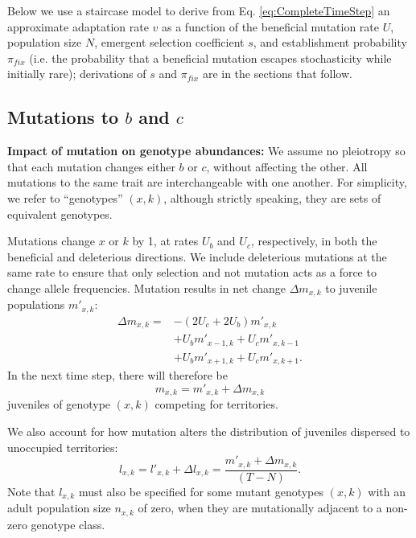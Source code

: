 \documentclass[9pt,twocolumn,twoside,lineno]{gsajnl}
\begin{document}
Below we use a staircase model \citep{desai2007beneficial} to derive from Eq. \ref{eq:CompleteTimeStep} an approximate adaptation rate $v$ as a function of the beneficial mutation rate $U$, population size $N$, emergent selection coefficient $s$, and establishment probability $\pi_{fix}$ (i.e. the probability that a beneficial mutation escapes stochasticity while initially rare); derivations of $s$ and $\pi_{fix}$ are in the sections that follow.

\subsection{Mutations to $b$ and $c$}
\label{sec:MutationSelection}
\textbf{Impact of mutation on genotype abundances:}
We assume no pleiotropy so that each mutation changes either $b$ or $c$, without affecting the other. All mutations to the same trait are interchangeable with one another. For simplicity, we refer to ``genotypes'' $(x,k)$, although strictly speaking, they are sets of equivalent genotypes. 

Mutations change $x$ or $k$ by 1, at rates $U_b$ and $U_c$, respectively, in both the beneficial and deleterious directions. We include deleterious mutations at the same rate to ensure that only selection and not mutation acts as a force to change allele frequencies. Mutation results in net change $\Delta m_{x,k}$ to juvenile populations ${m'}_{x,k}$:
\[
\begin{aligned}
\Delta m_{x,k} =& -(2U_c+2U_b){m'}_{x,k}\\ %
& +U_b {m'}_{x-1,k}+U_c {m'}_{x,k-1} \\ %
& +U_b {m'}_{x+1,k}+U_c {m'}_{x,k+1}.  %
\end{aligned}
\]
In the next time step, there will therefore be  
\[
m_{x,k} = {m'}_{x,k} + \Delta m_{x,k} 
\]
juveniles of genotype $(x,k)$ competing for territories. 

We also account for how mutation alters the distribution of juveniles dispersed to unoccupied territories:
\[
l_{x,k} ={l'}_{x,k} + \Delta l_{x,k} = \frac{{m'}_{x,k} + \Delta m_{x,k}}{(T-N)}.
\] 
Note that $l_{x,k}$ must also be specified for some mutant genotypes $(x,k)$ with an adult population size $n_{x,k}$ of zero, when they are mutationally adjacent to a non-zero genotype class. 
\end{document}
